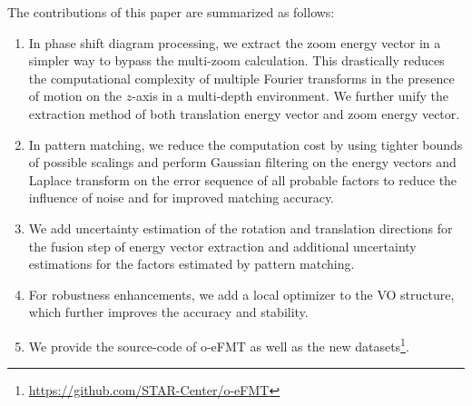 \documentclass[letterpaper, 10 pt, conference]{ieeeconf}  %
\begin{document}
The contributions of this paper are summarized as follows:
\begin{enumerate}
    \item In phase shift diagram processing, we extract the zoom energy vector in a simpler way to bypass the multi-zoom calculation. This drastically reduces the computational complexity of multiple Fourier transforms in the presence of motion on the $z$-axis in a multi-depth environment. We further unify the extraction method of both translation energy vector and zoom energy vector.
    \item In pattern matching, we reduce the computation cost by using tighter bounds of possible scalings and perform Gaussian filtering on the energy vectors and Laplace transform on the error sequence of all probable factors to reduce the influence of noise and for improved matching accuracy. 
    \item We add uncertainty estimation of the rotation and translation directions for the fusion step of energy vector extraction and additional uncertainty estimations for the factors estimated by pattern matching. 
    \item For robustness enhancements, we add a local optimizer to the VO structure, which further improves the accuracy and stability.
    \item We provide the source-code of o-eFMT as well as the new datasets\footnote{\url{https://github.com/STAR-Center/o-eFMT}}.
\end{enumerate}


\end{document}
